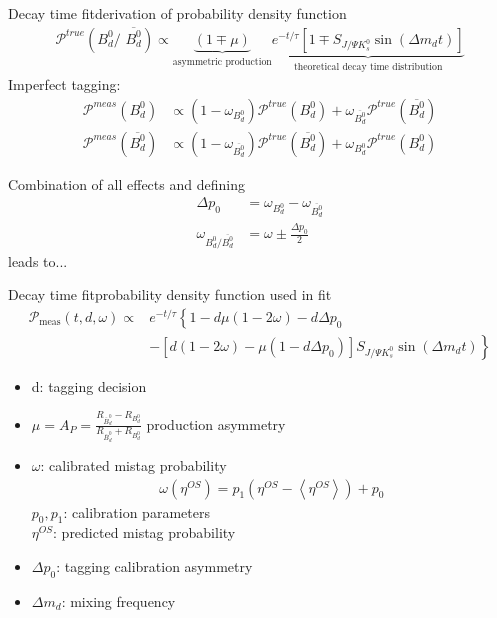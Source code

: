 \documentclass{beamer}
\newcommand{\Bd}{$B_d^0$}
\newcommand{\Bdbar}{$\overline{B_d^0}$}
\newcommand{\SJPsi}{S_{J/\Psi K_s^0}}
\begin{document}
	\begin{frame}{Decay time fit}{derivation of probability density function}
    \begin{align}
    \mathcal{P}^{true}(\text{\Bd / \Bdbar}) \propto \underbrace{(1\mp             \mu)}_{\text{asymmetric production}} \underbrace{e^{-t/\tau}\left[1\mp \SJPsi \sin(\Delta m_d t)\right]}_{\text{theoretical decay time distribution}}
    \end{align}	
    Imperfect tagging: \\
    \begin{align}
    \mathcal{P}^{meas}(\text{\Bd}) &\propto (1-\omega_{\text{\Bd}})\mathcal{P}^{true}(\text{\Bd}) + \omega_{\text{\Bdbar}} \mathcal{P}^{true}(\text{\Bdbar}) \\
 \mathcal{P}^{meas}(\text{\Bdbar}) &\propto (1-\omega_{\text{\Bdbar}})\mathcal{P}^{true}(\text{\Bdbar}) + \omega_{\text{\Bd}} \mathcal{P}^{true}(\text{\Bd})
    \end{align}

    Combination of all effects and defining 
    \begin{align}
    \Delta p_0 &= \omega_{\text{\Bd}}-\omega_{\text{\Bdbar}} \\
    \omega_{\text{\Bd}/\text{\Bdbar}} &= \omega \pm \frac{\Delta p_0}{2}
    \end{align}
	leads to...
	\end{frame}
	
	\begin{frame}{Decay time fit}{probability density function used in fit}
	\begin{align}
\nonumber\mathcal{P}_{\text{meas}}(t, d, \omega) \propto &e^{-t/\tau} \left\lbrace 1-d\mu(1-2\omega)-d\Delta p_0 \right. \\
&- \left.\left[d(1-2\omega)-\mu(1-d\Delta p_0)\right]\SJPsi\sin(\Delta m_d t)\right\rbrace
	\end{align}
	
	
	\begin{itemize}
		\item d: tagging decision
		\item $\mu = A_P = \frac{R_{\bar{B}_d^0}-R_{B_d^0}}{R_{\bar{B}_d^0}+R_{B_d^0}}$ production asymmetry
		\item $\omega$: calibrated mistag probability
		      \begin{align}
		      \omega(\eta^{OS}) = p_1 (\eta^{OS} - \left\langle \eta^{OS} \right\rangle) + p_0
		      \end{align}
		      $p_0, p_1$: calibration parameters \\
		      $\eta^{OS}$: predicted mistag probability
		\item $\Delta p_0$: tagging calibration asymmetry
		\item $\Delta m_d$: mixing frequency

	\end{itemize}	
	\end{frame}
	
\end{document}

